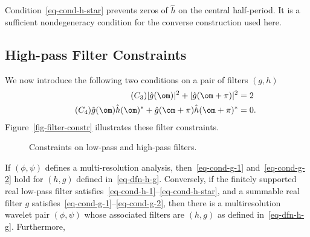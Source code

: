 Condition~\eqref{eq-cond-h-star} prevents zeros of $\hat h$ on the central half-period. It is a sufficient nondegeneracy condition for the converse construction used here.

\subsection{High-pass Filter Constraints}

We now introduce the following two conditions on a pair of filters $(g,h)$
\begin{align}
	\label{eq-cond-g-1}\tag{$C_3$}  |\hat g(\om)|^2 + |\hat g(\om+\pi)|^2&=2  \\
	\label{eq-cond-g-2}\tag{$C_4$}   \hat g(\om) \hat h(\om)^* + \hat g(\om+\pi) \hat h(\om+\pi)^*&=0.
\end{align}
Figure~\ref{fig-filter-constr} illustrates these filter constraints.

\begin{figure}[tbp]
\centering
{}
\caption{Constraints on low-pass and high-pass filters.}
\label{fig-filter-constr}
\label{fig-filters-complements}
\end{figure}



\begin{thm}\label{thm-wave-h}
	If $(\phi,\psi)$ defines a multi-resolution analysis, then~\eqref{eq-cond-g-1} and~\eqref{eq-cond-g-2} hold for $(h,g)$ defined in~\eqref{eq-dfn-h-g}.
	Conversely, if the finitely supported real low-pass filter satisfies~\eqref{eq-cond-h-1}--\eqref{eq-cond-h-star}, and a summable real filter $g$ satisfies~\eqref{eq-cond-g-1}--\eqref{eq-cond-g-2}, then there is a multiresolution wavelet pair $(\phi,\psi)$ whose associated filters are $(h,g)$ as defined in~\eqref{eq-dfn-h-g}. Furthermore,
\end{thm}

